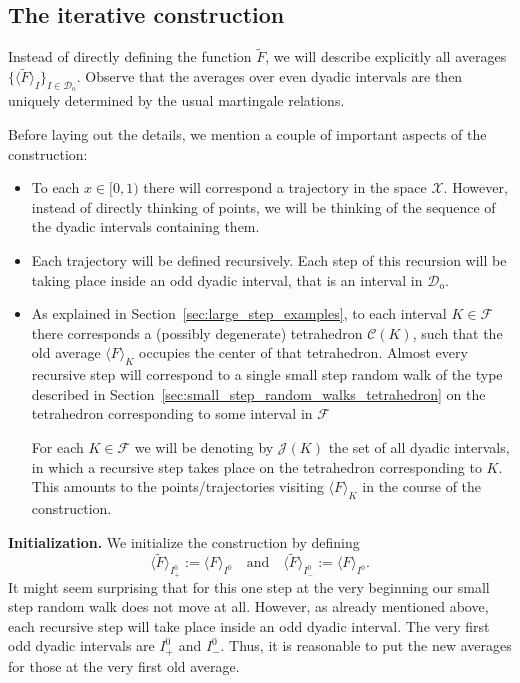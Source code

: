 \documentclass{amsart}
\newcommand{\cD}{\mathcal{D}}
\newcommand{\wt}{\widetilde}
\theoremstyle{definition}
\theoremstyle{remark}
\begin{document}
\subsection{The iterative construction}

Instead of directly defining the function $\wt{F}$, we will describe explicitly all averages $\{\langle\wt{F}\rangle_{I}\}_{I\in\cD_{\mathrm{o}}}$. Observe that the averages over even dyadic intervals are then uniquely determined by the usual martingale relations.

Before laying out the details, we mention a couple of important aspects of the construction:
\begin{itemize}
    \item To each $x\in[0,1)$ there will correspond a trajectory in the space $\mathscr{X}$. However, instead of directly thinking of points, we will be thinking of the sequence of the dyadic intervals containing them.
    
    \item Each trajectory will be defined recursively. Each step of this recursion will be taking place inside an odd dyadic interval, that is an interval in $\cD_{\mathrm{o}}$.

    \item As explained in Section~\ref{sec:large_step_examples}, to each interval $K\in\mathscr{F}$ there corresponds a (possibly degenerate) tetrahedron $\mathscr{C}(K)$, such that the old average $\langle F\rangle_{K}$ occupies the center of that tetrahedron. Almost every recursive step will correspond to a single small step random walk of the type described in Section~\ref{sec:small_step_random_walks_tetrahedron} on the tetrahedron corresponding to some interval in $\mathscr{F}$
    
    For each $K\in\mathscr{F}$ we will be denoting by $\mathscr{J}(K)$ the set of all dyadic intervals, in which a recursive step takes place on the tetrahedron corresponding to $K$. This amounts to the points/trajectories visiting $\langle F\rangle_{K}$ in the course of the construction.
\end{itemize}

\medskip

\textbf{Initialization.} We initialize the construction by defining
\begin{equation*}
    \langle\wt{F}\rangle_{I^{0}_{+}}:=\langle F\rangle_{I^0}\quad\text{and}\quad\langle\wt{F}\rangle_{I^{0}_{-}}:=\langle F\rangle_{I^0}.
\end{equation*}
It might seem surprising that for this one step at the very beginning our small step random walk does not move at all. However, as already mentioned above, each recursive step will take place inside an odd dyadic interval. The very first odd dyadic intervals are $I^{0}_{+}$ and $I^{0}_{-}$. Thus, it is reasonable to put the new averages for those at the very first old average.
\medskip
\end{document}
